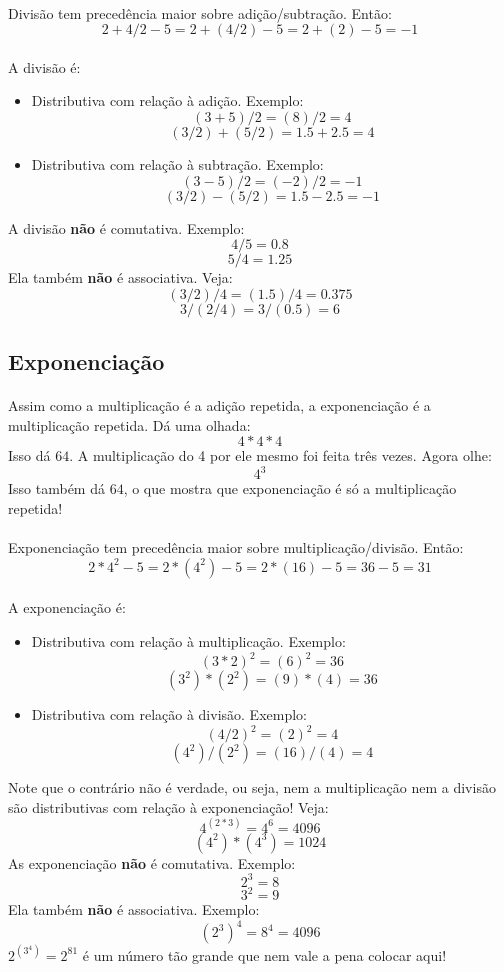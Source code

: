 \documentclass[12pt]{article}
\begin{document}
\paragraph{}
Divisão tem precedência maior sobre adição/subtração. Então:
$$2 + 4/2 - 5 = 2 + (4/2) - 5 = 2 + (2) - 5 = -1$$
\paragraph{}
A divisão é:
\begin{itemize}
\item Distributiva com relação à adição. Exemplo:
$$(3 + 5)/2 = (8)/2 = 4$$
$$(3/2) + (5/2) = 1.5 + 2.5 = 4$$
\item Distributiva com relação à subtração. Exemplo:
$$(3 - 5)/2 = (-2)/2 = -1$$
$$(3/2) - (5/2) = 1.5 - 2.5 = -1$$
\end{itemize}
A divisão \textbf{não} é comutativa. Exemplo:
$$4 / 5 = 0.8$$
$$5 / 4 = 1.25$$
Ela também \textbf{não} é associativa. Veja:
$$(3 / 2) / 4 = (1.5)/4 = 0.375$$
$$3 / (2 / 4) = 3 / (0.5) = 6$$

\subsection{Exponenciação}
\paragraph{}
Assim como a multiplicação é a adição repetida, a exponenciação é a 
multiplicação repetida. Dá uma olhada:
$$4 * 4 * 4$$
Isso dá $64$. A multiplicação do 4 por ele mesmo foi feita três vezes. 
Agora olhe:
$$4^3$$
Isso também dá $64$, o que mostra que exponenciação é só a multiplicação
repetida!
\paragraph{}
Exponenciação tem precedência maior sobre multiplicação/divisão. Então:
$$2 * 4^2 - 5 = 2 * (4^2) - 5 = 2 * (16) - 5 = 36 - 5 = 31$$
\paragraph{}
A exponenciação é:
\begin{itemize}
\item Distributiva com relação à multiplicação. Exemplo:
$${(3*2)}^2 = {(6)}^2 = 36$$
$$(3^2)*(2^2) = (9)*(4) = 36$$
\item Distributiva com relação à divisão. Exemplo:
$${(4/2)}^2 = {(2)}^2 = 4$$
$$(4^2)/(2^2) = (16)/(4) = 4$$
\end{itemize}
Note que o contrário não é verdade, ou seja, nem a multiplicação nem a 
divisão são distributivas com relação à exponenciação! Veja:
$$4^{(2*3)} = 4^6 = 4096$$
$$(4^2)*(4^3) = 1024$$
As exponenciação \textbf{não} é comutativa. Exemplo:
$$2^3 = 8$$
$$3^2 = 9$$
Ela também \textbf{não} é associativa. Exemplo:
$${(2^3)}^4 = 8^4 = 4096$$
$2^{(3^4)} = 2^{81}$ é um número tão grande que nem vale a pena colocar aqui!
\end{document}
